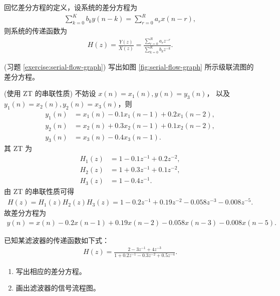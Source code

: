 \begin{property}[传递函数和差分方程之间的关系]
    回忆差分方程的定义，设系统的差分方程为
    \begin{align*}
        \sum_{k = 0}^{K}b_ky(n-k) = \sum_{r = 0}^{R}a_rx(n-r),
    \end{align*}
    则系统的传递函数为
    \begin{align*}
        H(z) = \frac{Y(z)}{X(z)} = \frac{\sum_{r = 0}^{R}a_rz^{-r}}{\sum_{k = 0}^{K}b_kz^{-k}}.
    \end{align*}
\end{property}

\begin{exercise}
    (习题 \ref{exercise:serial-flow-graph})
    写出如图 \ref{fig:serial-flow-graph} 所示级联流图的差分方程。
\end{exercise}

\begin{solution}
    (使用 ZT 的串联性质)
    不妨设 $x(n) = x_1(n), y(n) = y_3(n)$，
    以及 $y_1(n) = x_2(n), y_2(n) = x_3(n)$，则
    \begin{align*}
        y_1(n) & = x_1(n) - 0.1x_1(n - 1) + 0.2x_1(n - 2), \\
        y_2(n) & = x_2(n) + 0.3x_2(n - 1) + 0.1x_2(n - 2), \\
        y_3(n) & = x_3(n) - 0.4x_3(n - 1).
    \end{align*}
    其 ZT 为
    \begin{align*}
        H_1(z) & = 1 - 0.1z^{-1} + 0.2z^{-2}, \\
        H_2(z) & = 1 + 0.3z^{-1} + 0.1z^{-2}, \\
        H_3(z) & = 1 - 0.4z^{-1}.
    \end{align*}
    由 ZT 的串联性质可得
    \begin{align*}
        H(z) = H_1(z)H_2(z)H_3(z) = 1 - 0.2z^{-1} + 0.19z^{-2} - 0.058z^{-3} - 0.008z^{-5}.
    \end{align*}
    故差分方程为
    \begin{align*}
        y(n) = x(n) - 0.2x(n - 1) + 0.19x(n - 2) - 0.058x(n - 3) - 0.008x(n - 5).
    \end{align*}
\end{solution}

\begin{example}
    已知某滤波器的传递函数如下式：
    \begin{align*}
        H(z) = \frac{2 - 3z^{-1} + 4z^{-3}}{1 + 0.2z^{-1} - 0.3z^{-2} + 0.5z^{-4}}.
    \end{align*}
    \begin{enumerate}[label=(\arabic*)]
        \item 写出相应的差分方程。
        \item 画出滤波器的信号流程图。
    \end{enumerate}
\end{example}

